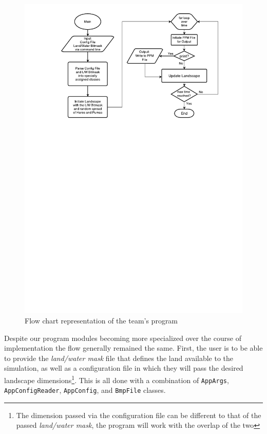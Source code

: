 \begin{figure}
   \begin{center}
      \includegraphics[width=\textwidth]{PS-Coursework-Flow.pdf}
   \end{center}
   \caption{Flow chart representation of the team's program }
   \label{fig:DesignFlowChart}
\end{figure}

Despite our program modules becoming more specialized over the course of implementation the flow generally remained the same. First, the user is to be able to provide the \textit{land/water mask} file that defines the land available to the simulation, as well as a configuration file in which they will pass the desired landscape dimensions\footnote{The dimension passed via the configuration file can be different to that of the passed \textit{land/water mask}, the program will work with the overlap of the two}. This is all done with a combination of \texttt{AppArgs}, \texttt{AppConfigReader}, \texttt{AppConfig}, and \texttt{BmpFile} classes.  

